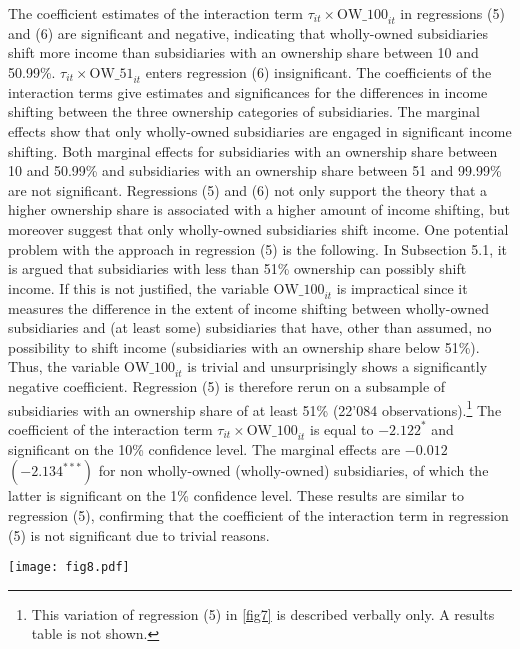 \documentclass[10pt,twocolumn,oneside,cmyk]{article}
\begin{document}
The coefficient estimates of the interaction term $\tau_{it} \times \text{OW\_100}_{it}$ in regressions (5) and (6) are significant and negative, indicating that wholly-owned subsidiaries shift more income than subsidiaries with an ownership share between 10 and 50.99\%. $\tau_{it} \times \text{OW\_51}_{it}$ enters regression (6) insignificant. The coefficients of the interaction terms give estimates and significances for the differences in income shifting between the three ownership categories of subsidiaries. The marginal effects show that only wholly-owned subsidiaries are engaged in significant income shifting. Both marginal effects for subsidiaries with an ownership share between 10 and 50.99\% and subsidiaries with an ownership share between 51 and 99.99\% are not significant. Regressions (5) and (6) not only support the theory that a higher ownership share is associated with a higher amount of income shifting, but moreover suggest that only wholly-owned subsidiaries shift income. One potential problem with the approach in regression (5) is the following. In Subsection 5.1, it is argued that subsidiaries with less than 51\% ownership can possibly shift income. If this is not justified, the variable $\text{OW\_100}_{it}$ is impractical since it measures the difference in the extent of income shifting between wholly-owned subsidiaries and (at least some) subsidiaries that have, other than assumed, no possibility to shift income (subsidiaries with an ownership share below 51\%). Thus, the variable $\text{OW\_100}_{it}$ is trivial and unsurprisingly shows a significantly negative coefficient. Regression (5) is therefore rerun on a subsample of subsidiaries with an ownership share of at least 51\% (22'084 observations).\footnote{This variation of regression (5) in \cref{fig7} is described verbally only. A results table is not shown.} The coefficient of the interaction term $\tau_{it} \times \text{OW\_100}_{it}$ is equal to $-2.122^*$ and significant on the 10\% confidence level. The marginal effects are $-0.012$ $(-2.134^{***})$ for non wholly-owned (wholly-owned) subsidiaries, of which the latter is significant on the 1\% confidence level. These results are similar to regression (5), confirming that the coefficient of the interaction term in regression (5) is not significant due to trivial reasons.

\begin{figure*}[t]
 \centering \captionsetup{width=0.95\textwidth}
   \texttt{[image: fig8.pdf]}
 \caption[3D Marginal effect of the tax differential in regression (1) in \cref{tab8}]{3D Marginal effect of the tax differential in regression (1) in \cref{tab8}. The marginal effect is plotted for wholly-owned subsidiaries with shifting direction to the parent firm. The plane represents the marginal effect according to the partial derivative of regression (1) in \cref{tab8}. Source: own figure.} \label{fig8}
\end{figure*}
\end{document}
